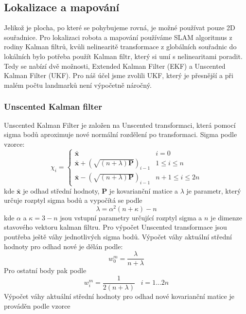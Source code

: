 \documentclass[a4paper,12pt]{article}
\begin{document}
\subsection{Lokalizace a mapování}
Jelikož je plocha, po které se pohybujeme rovná, je možné používat pouze 2D souřadnice. Pro lokalizaci robota a mapování používáme SLAM algoritmus z rodiny 
Kalman filtrů, kvůli nelinearitě transformace z globálních souřadnic do lokálních bylo potřeba použít Kalman filtr, který si umí s nelinearitami poradit. 
Tedy se nabízí dvě možnosti, Extended Kalman Filter (EKF) a Unscented Kalman Filter (UKF). Pro náš účel jsme zvolili UKF, který je přesnější a při malém počtu landmarků není výpočetně náročný.
\subsubsection{Unscented Kalman filter}
\label{sec:ukf}
Unscented Kalman Filter je založen na Unscented transformaci, která pomocí sigma bodů aproximuje nové normální rozdělení po transformaci. 
Sigma podle vzorce:
\begin{equation}
    \chi_{i} = \begin{cases}
        \mathbf{\bar{x}} & i = 0 \\
        \mathbf{\bar{x}} + (\sqrt{(n + \lambda) \mathbf P})_{i-1} & 1 \leq i \leq n \\
        \mathbf{\bar{x}} - (\sqrt{(n + \lambda) \mathbf P})_{i-1} & n + 1 \leq i \leq 2n
    \end{cases}
\end{equation}
kde $\mathbf{\bar{x}}$ je odhad střední hodnoty, $\mathbf P$ je kovarianční matice a $\lambda$ je parametr, který určuje rozptyl sigma bodů a vypočítá se podle
\begin{equation}
    \lambda = \alpha^2(n + \kappa) - n
\end{equation}
kde $\alpha$ a $\kappa = 3 - n$ jsou vstupní parametry určující rozptyl sigma a $n$ je dimenze stavového vektoru kalman filtru. 
Pro výpočet Unscented transformace jsou poutřeba ještě váhy jednotlivých sigma bodů. 
Výpočet váhy aktuální střední hodnoty pro odhad nové je dělán podle: 
\begin{equation}
    w^{m}_0 = \frac{\lambda}{n + \lambda}
\end{equation}
Pro ostatní body pak podle 
\begin{equation}
    w^m_i = \frac{1}{2(n+\lambda)} \;\;\; i = 1...2n
    \label{eq:mean_weights}
\end{equation}
Výpočet váhy aktuální střední hodnoty pro odhad nové kovarianční matice je prováděn podle vzorce
\end{document}
